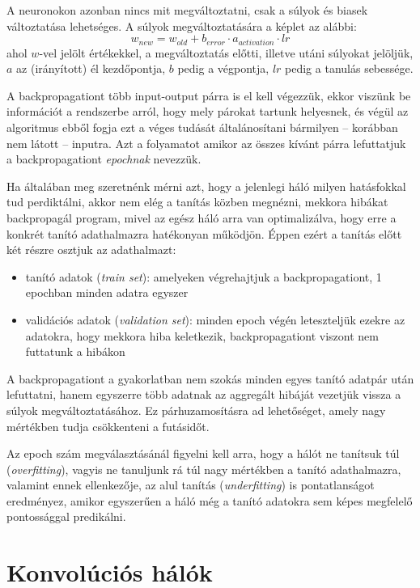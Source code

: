 A neuronokon azonban nincs mit megváltoztatni, csak a súlyok és biasek változtatása lehetséges. A súlyok megváltoztatására a képlet az alábbi:
$$ w_{new} =  w_{old} + b_{error} \cdot a_{activation} \cdot lr $$
ahol $w$-vel jelölt értékekkel, a megváltoztatás előtti, illetve utáni súlyokat jelöljük, $a$ az (irányított) él kezdőpontja, $b$ pedig a végpontja, $lr$ pedig a tanulás sebessége.

A backpropagationt több input-output párra is el kell végezzük, ekkor viszünk be információt a rendszerbe arról, hogy mely párokat tartunk helyesnek, és végül az algoritmus ebből fogja ezt a véges tudását általánosítani bármilyen -- korábban nem látott -- inputra. Azt a folyamatot amikor az összes kívánt párra lefuttatjuk a backpropagationt \emph{epochnak} nevezzük. 

Ha általában meg szeretnénk mérni azt, hogy a jelenlegi háló milyen hatásfokkal tud perdiktálni, akkor nem elég a tanítás közben megnézni, mekkora hibákat backpropagál program, mivel az egész háló arra van optimalizálva, hogy erre a konkrét tanító adathalmazra hatékonyan működjön. Éppen ezért a tanítás előtt két részre osztjuk az adathalmazt:

\begin{itemize}  
	\item tanító adatok (\emph{train set}): amelyeken végrehajtjuk a backpropagationt, 1 epochban minden adatra egyszer
	\item validációs adatok (\emph{validation set}): minden epoch végén leteszteljük ezekre az adatokra, hogy mekkora hiba keletkezik, backpropagationt viszont nem futtatunk a hibákon
\end{itemize}

A backpropagationt a gyakorlatban nem szokás minden egyes tanító adatpár után lefuttatni, hanem egyszerre több adatnak az aggregált hibáját vezetjük vissza a súlyok megváltoztatásához. Ez párhuzamosításra ad lehetőséget, amely nagy mértékben tudja csökkenteni a futásidőt.

Az epoch szám megválasztásánál figyelni kell arra, hogy a hálót ne tanítsuk túl (\emph{overfitting}), vagyis ne tanuljunk rá túl nagy mértékben a tanító adathalmazra, valamint ennek ellenkezője, az alul tanítás (\emph{underfitting}) is pontatlanságot eredményez, amikor egyszerűen a háló még a tanító adatokra sem képes megfelelő pontossággal predikálni.

\section{Konvolúciós hálók}

